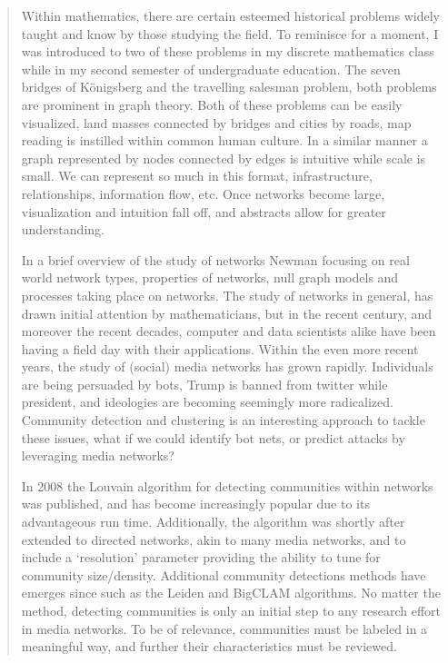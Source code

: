 \documentclass[a4paper, 12pt]{article} %
\begin{document}
\begin{abstract}
\vspace{0.25cm}

Within mathematics, there are certain esteemed historical problems widely taught and know by those studying the field.
To reminisce for a moment, I was introduced to two of these problems in my discrete mathematics class while in my second semester of undergraduate education.
The seven bridges of Königsberg and the travelling salesman problem, both problems are prominent in graph theory.
Both of these problems can be easily visualized, land masses connected by bridges and cities by roads, map reading is instilled within common human culture.
In a similar manner a graph represented by nodes connected by edges is intuitive while scale is small.
We can represent so much in this format, infrastructure, relationships, information flow, etc.
Once networks become large, visualization and intuition fall off, and abstracts allow for greater understanding.

In a brief overview of the study of networks \cite{struc_funct_cnets} Newman focusing on real world network types, properties of networks, null graph models and processes taking place on networks.
The study of networks in general, has drawn initial attention by mathematicians, but in the recent century, and moreover the recent decades, computer and data scientists alike have been having a field day with their applications.
Within the even more recent years, the study of (social) media networks has grown rapidly.
Individuals are being persuaded by bots, Trump is banned from twitter while president, and ideologies are becoming seemingly more radicalized.
Community detection and clustering is an interesting approach to tackle these issues, what if we could identify bot nets, or predict attacks by leveraging media networks?

In 2008 the Louvain algorithm \cite{louvain} for detecting communities within networks was published, and has become increasingly popular due to its advantageous run time.
Additionally, the algorithm was shortly after extended to directed networks, akin to many media networks, and to include a `resolution' parameter \cite{louvain_resolution} providing the ability to tune for community size/density.
Additional community detections methods have emerges since such as the Leiden \cite{louvain_2_leiden} and BigCLAM \cite{bigclam} algorithms.
No matter the method, detecting communities is only an initial step to any research effort in media networks.
To be of relevance, communities must be labeled in a meaningful way, and further their characteristics must be reviewed.


\end{abstract}
\end{document}
